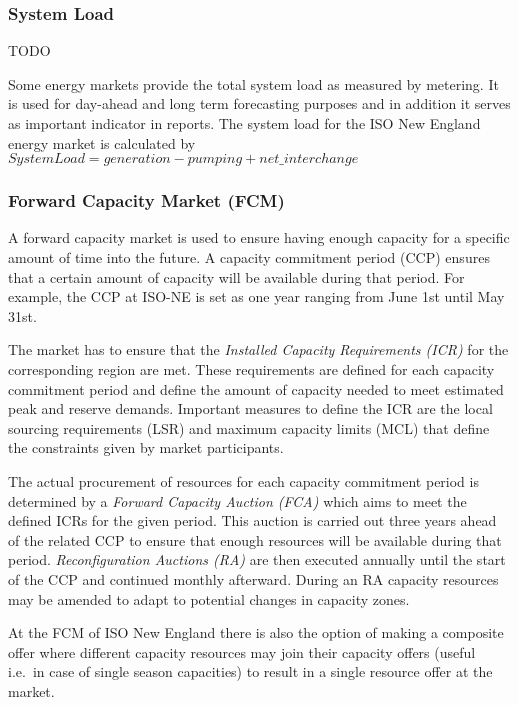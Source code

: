 \subsubsection{System Load}

TODO

Some energy markets provide the total system load as measured by metering. It is used for day-ahead and long term forecasting purposes and in addition it serves as important indicator in reports. The system load for the ISO New England energy market is calculated by $System Load = generation - pumping + net\_interchange$


\subsubsection{Forward Capacity Market (FCM)}

A forward capacity market is used to ensure having enough capacity for a specific amount of time into the future. A capacity commitment period (CCP) ensures that a certain amount of capacity will be available during that period. For example, the CCP at ISO-NE is set as one year ranging from June 1st until May 31st. 

The market has to ensure that the \emph{Installed Capacity Requirements (ICR)} for the corresponding region are met. These requirements are defined for each capacity commitment period and define the amount of capacity needed to meet estimated peak and reserve demands. Important measures to define the ICR are the local sourcing requirements (LSR) and maximum capacity limits (MCL) that define the constraints given by market participants. %

The actual procurement of resources for each capacity commitment period is determined by a \emph{Forward Capacity Auction (FCA)} which aims to meet the defined ICRs for the given period.
This auction is carried out three years ahead of the related CCP to ensure that enough resources will be available during that period. \emph{Reconfiguration Auctions (RA)} are then executed annually until the start of the CCP and continued monthly afterward. During an RA capacity resources may be amended to adapt to potential changes in capacity zones. 

At the FCM of ISO New England there is also the option of making a composite offer where different capacity resources may join their capacity offers (useful i.e.~in case of single season capacities) to result in a single resource offer at the market. 

